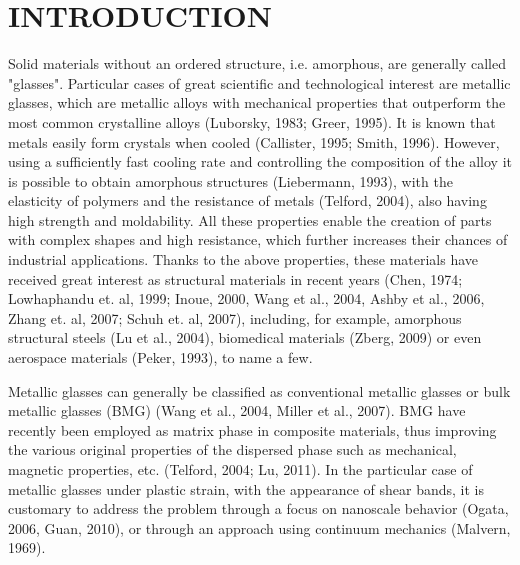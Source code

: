 \section{INTRODUCTION}
Solid materials without an ordered structure, i.e. amorphous, are generally called "glasses". Particular cases of great scientific and technological interest are metallic glasses, which are metallic alloys with mechanical properties that outperform the most common crystalline alloys (Luborsky, 1983; Greer, 1995). It is known that metals easily form crystals when cooled (Callister, 1995; Smith, 1996). However, using a sufficiently fast cooling rate and controlling the composition of the alloy it is possible to obtain amorphous structures (Liebermann, 1993), with the elasticity of polymers and the resistance of metals (Telford, 2004), also having high strength and moldability. All these properties enable the creation of parts with complex shapes and high resistance, which further increases their chances of industrial applications. Thanks to the above properties, these materials have received great interest as structural materials in recent years (Chen, 1974; Lowhaphandu et. al, 1999; Inoue, 2000, Wang et al., 2004, Ashby et al., 2006, Zhang et. al, 2007; Schuh et. al, 2007), including, for example, amorphous structural steels (Lu et al., 2004), biomedical materials (Zberg, 2009) or even aerospace materials (Peker, 1993), to name a few.

Metallic glasses can generally be classified as conventional metallic glasses or bulk metallic glasses (BMG) (Wang et al., 2004, Miller et al., 2007). BMG have recently been employed as matrix phase in composite materials, thus improving the various original properties of the dispersed phase such as mechanical, magnetic properties, etc. (Telford, 2004; Lu, 2011). In the particular case of metallic glasses under plastic strain, with the appearance of shear bands, it is customary to address the problem through a focus on nanoscale behavior (Ogata, 2006, Guan, 2010), or through an approach using continuum mechanics (Malvern, 1969).

